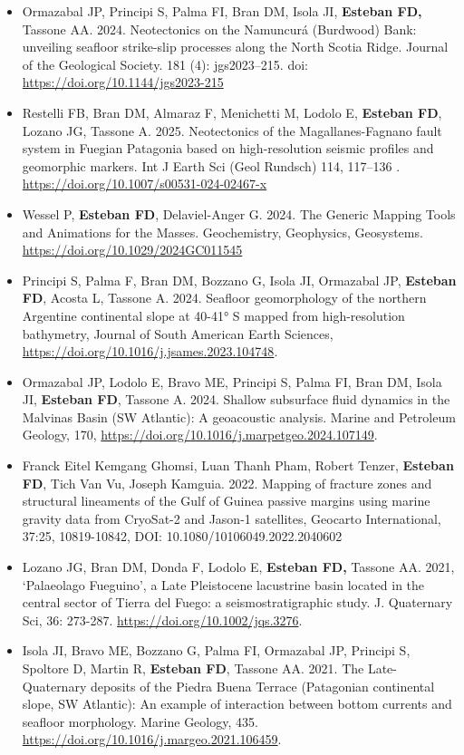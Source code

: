 \documentclass[11pt, a4paper]{article}
\begin{document}
\begin{itemize}
    \item Ormazabal JP, Principi S, Palma FI, Bran DM, Isola JI, \textbf{Esteban FD,} Tassone AA. 2024. Neotectonics on the Namuncurá (Burdwood) Bank: unveiling seafloor strike-slip processes along the North Scotia Ridge. Journal of the Geological Society. 181 (4): jgs2023–215. doi: \url{https://doi.org/10.1144/jgs2023-215}
    \item Restelli FB, Bran DM, Almaraz F, Menichetti M, Lodolo E, \textbf{Esteban FD}, Lozano JG, Tassone A. 2025. Neotectonics of the Magallanes-Fagnano fault system in Fuegian Patagonia based on high-resolution seismic profiles and geomorphic markers. Int J Earth Sci (Geol Rundsch) 114, 117–136 . \url{https://doi.org/10.1007/s00531-024-02467-x}
    \item Wessel P, \textbf{Esteban FD}, Delaviel-Anger G. 2024. The Generic Mapping Tools and Animations for the Masses. Geochemistry, Geophysics, Geosystems. \url{https://doi.org/10.1029/2024GC011545}
    \item Principi S, Palma F, Bran DM, Bozzano G, Isola JI, Ormazabal JP, \textbf{Esteban FD}, Acosta L, Tassone A. 2024. Seafloor geomorphology of the northern Argentine continental slope at 40-41° S mapped from high-resolution bathymetry, Journal of South American Earth Sciences, \url{https://doi.org/10.1016/j.jsames.2023.104748}.
    \item Ormazabal JP, Lodolo E, Bravo ME, Principi S, Palma FI, Bran DM, Isola JI, \textbf{Esteban FD}, Tassone A. 2024. Shallow subsurface fluid dynamics in the Malvinas Basin (SW Atlantic): A geoacoustic analysis. Marine and Petroleum Geology, 170, \url{https://doi.org/10.1016/j.marpetgeo.2024.107149}.
    \item Franck Eitel Kemgang Ghomsi, Luan Thanh Pham, Robert Tenzer, \textbf{Esteban FD}, Tich Van Vu, Joseph Kamguia. 2022. Mapping of fracture zones and structural lineaments of the Gulf of Guinea passive margins using marine gravity data from CryoSat-2 and Jason-1 satellites, Geocarto International, 37:25, 10819-10842, DOI: 10.1080/10106049.2022.2040602
    \item Lozano JG, Bran DM, Donda F, Lodolo E, \textbf{Esteban FD,} Tassone AA. 2021, ‘Palaeolago Fueguino’, a Late Pleistocene lacustrine basin located in the central sector of Tierra del Fuego: a seismostratigraphic study. J. Quaternary Sci, 36: 273-287. \url{https://doi.org/10.1002/jqs.3276}.
    \item Isola JI, Bravo ME, Bozzano G, Palma FI, Ormazabal JP, Principi S, Spoltore D, Martin R, \textbf{Esteban FD}, Tassone AA. 2021. The Late-Quaternary deposits of the Piedra Buena Terrace (Patagonian continental slope, SW Atlantic): An example of interaction between bottom currents and seafloor morphology. Marine Geology, 435. \url{https://doi.org/10.1016/j.margeo.2021.106459}.

\end{itemize}
\end{document}
